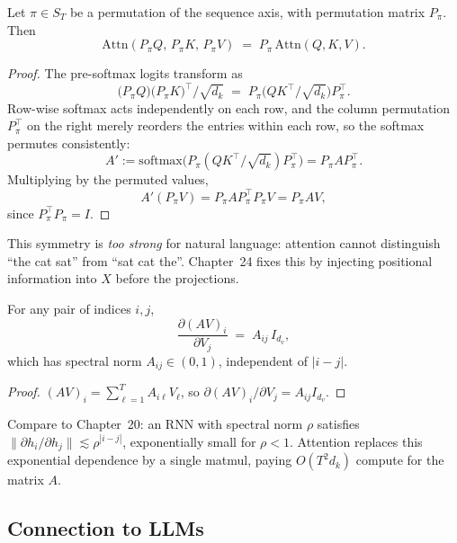 \begin{theorem}
Let $\pi \in S_T$ be a permutation of the sequence axis, with permutation matrix $P_\pi$. Then
\[
\mathrm{Attn}(P_\pi Q,\, P_\pi K,\, P_\pi V) \;=\; P_\pi \, \mathrm{Attn}(Q, K, V).
\]
\end{theorem}
\begin{proof}
The pre-softmax logits transform as
\[
\bigl(P_\pi Q\bigr)\bigl(P_\pi K\bigr)^\top / \sqrt{d_k} \;=\; P_\pi \bigl(QK^\top / \sqrt{d_k}\bigr) P_\pi^\top.
\]
Row-wise softmax acts independently on each row, and the column permutation $P_\pi^\top$ on the right merely reorders the entries within each row, so the softmax permutes consistently:
\[
A' := \mathrm{softmax}\bigl(P_\pi (QK^\top/\sqrt{d_k}) P_\pi^\top\bigr) = P_\pi A P_\pi^\top.
\]
Multiplying by the permuted values,
\[
A' (P_\pi V) = P_\pi A P_\pi^\top P_\pi V = P_\pi A V,
\]
since $P_\pi^\top P_\pi = I$. \qedhere
\end{proof}

\begin{remark}
This symmetry is \emph{too strong} for natural language: attention cannot distinguish ``the cat sat'' from ``sat cat the''. Chapter~24 fixes this by injecting positional information into $X$ before the projections.
\end{remark}

\begin{theorem}
\label{thm:O1grad}
For any pair of indices $i,j$,
\[
\frac{\partial (AV)_i}{\partial V_j} \;=\; A_{ij} \, I_{d_v},
\]
which has spectral norm $A_{ij} \in (0,1)$, independent of $|i - j|$.
\end{theorem}
\begin{proof}
$(AV)_i = \sum_{\ell=1}^{T} A_{i\ell} V_\ell$, so $\partial (AV)_i/\partial V_j = A_{ij} I_{d_v}$. \qedhere
\end{proof}

\begin{remark}
Compare to Chapter~20: an RNN with spectral norm $\rho$ satisfies $\|\partial h_i/\partial h_j\| \lesssim \rho^{|i-j|}$, exponentially small for $\rho < 1$. Attention replaces this exponential dependence by a single matmul, paying $O(T^2 d_k)$ compute for the matrix $A$.
\end{remark}

\subsection*{Connection to LLMs}

